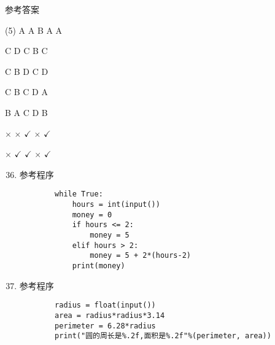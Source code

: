 \documentclass[11pt]{ctexart}
\begin{document}
\begin{center}
    \Huge \heiti 参考答案
\end{center}

    \begin{tasks}[label=\arabic*.](5)
        \task A
        \task A
        \task B
        \task A
        \task A

        \task C
        \task D
        \task C
        \task B
        \task C

        \task C
        \task B
        \task D
        \task C
        \task D

        \task C
        \task B
        \task C
        \task D
        \task A

        \task B
        \task A
        \task C
        \task D
        \task B

        \task $\times$
        \task $\times$
        \task $\checkmark$
        \task $\times$
        \task $\checkmark$

        \task $\times$
        \task $\checkmark$
        \task $\checkmark$
        \task $\times$
        \task $\checkmark$
    \end{tasks}

\begin{enumerate}
    \setcounter{enumi}{35}
    \item 参考程序
    \begin{lstlisting}
        while True:
            hours = int(input())
            money = 0
            if hours <= 2:
                money = 5
            elif hours > 2:
                money = 5 + 2*(hours-2)
            print(money)
    \end{lstlisting}

    \item 参考程序
    \begin{lstlisting}
        radius = float(input())
        area = radius*radius*3.14
        perimeter = 6.28*radius
        print("圆的周长是%.2f,面积是%.2f"%(perimeter, area))
    \end{lstlisting}
\end{enumerate}
\end{document}
